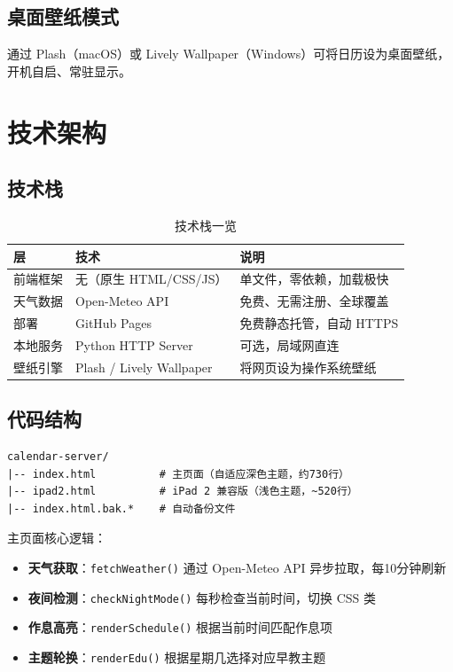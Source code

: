 \documentclass[12pt,a4paper,fontset=fandol]{ctexart}
\begin{document}
\subsection{桌面壁纸模式}

通过 Plash（macOS）或 Lively Wallpaper（Windows）可将日历设为桌面壁纸，开机自启、常驻显示。

\section{技术架构}

\subsection{技术栈}

\begin{table}[htbp]
\centering
\begin{tabular}{llp{5.5cm}}
\toprule
\textbf{层} & \textbf{技术} & \textbf{说明} \\
\midrule
前端框架 & 无（原生 HTML/CSS/JS） & 单文件，零依赖，加载极快 \\
天气数据 & Open-Meteo API & 免费、无需注册、全球覆盖 \\
部署 & GitHub Pages & 免费静态托管，自动 HTTPS \\
本地服务 & Python HTTP Server & 可选，局域网直连 \\
壁纸引擎 & Plash / Lively Wallpaper & 将网页设为操作系统壁纸 \\
\bottomrule
\end{tabular}
\caption{技术栈一览}
\end{table}

\subsection{代码结构}

\begin{lstlisting}[basicstyle=\ttfamily\small]
calendar-server/
|-- index.html          # 主页面（自适应深色主题，约730行）
|-- ipad2.html          # iPad 2 兼容版（浅色主题，~520行）
|-- index.html.bak.*    # 自动备份文件
\end{lstlisting}

主页面核心逻辑：

\begin{itemize}
    \item \textbf{天气获取}：\texttt{fetchWeather()} 通过 Open-Meteo API 异步拉取，每10分钟刷新
    \item \textbf{夜间检测}：\texttt{checkNightMode()} 每秒检查当前时间，切换 CSS 类
    \item \textbf{作息高亮}：\texttt{renderSchedule()} 根据当前时间匹配作息项
    \item \textbf{主题轮换}：\texttt{renderEdu()} 根据星期几选择对应早教主题
\end{itemize}
\end{document}
